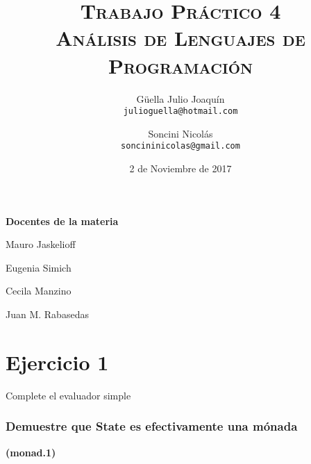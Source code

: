 \documentclass[a4paper,10pt]{article}
\author{
    Güella Julio Joaquín \\
    \texttt{julioguella@hotmail.com}
    \and
    Soncini Nicolás \\
    \texttt{soncininicolas@gmail.com}
}
\date{
    2 de Noviembre de 2017
}
\title{
    \Huge \textsc{Trabajo Práctico 4} \\
    \large \textsc{Análisis de Lenguajes de Programación} \\
}
\begin{document}
\bigskip
\bigskip
\bigskip

\maketitle

\thispagestyle{empty}

\begin{center}
\large \bf Docentes de la materia
\end{center}

\begin{center}
Mauro Jaskelioff

Eugenia Simich

Cecila Manzino

Juan M. Rabasedas
\end{center}

\newpage{}


\part*{Ejercicio 1}
Complete el evaluador simple

\section*{Demuestre que State es efectivamente una mónada}
\textbf{(monad.1)}
\end{document}
